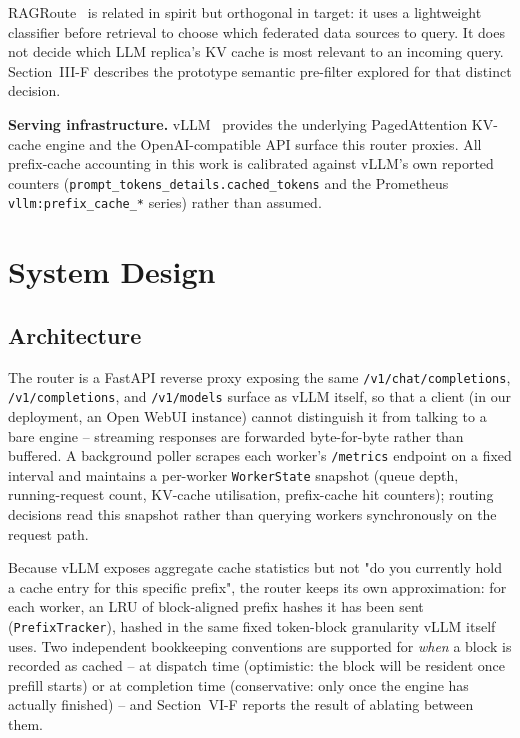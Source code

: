 \documentclass[conference]{IEEEtran}
\begin{document}
RAGRoute~\cite{ragroute2026} is related in spirit but orthogonal in
target: it uses a lightweight classifier before retrieval to choose
which federated data sources to query. It does not decide which LLM
replica's KV cache is most relevant to an incoming query. Section~III-F
describes the prototype semantic pre-filter explored for that distinct
decision.

\textbf{Serving infrastructure.} vLLM~\cite{kwon2023vllm} provides the
underlying PagedAttention KV-cache engine and the OpenAI-compatible API
surface this router proxies. All prefix-cache accounting in this work
is calibrated against vLLM's own reported counters
(\texttt{prompt\_tokens\_details.cached\_tokens} and the Prometheus
\texttt{vllm:prefix\_cache\_*} series) rather than assumed.

\section{System Design}

\subsection{Architecture}

The router is a FastAPI reverse proxy exposing the same
\texttt{/v1/chat/completions}, \texttt{/v1/completions}, and
\texttt{/v1/models} surface as vLLM itself, so that a client (in our
deployment, an Open WebUI instance) cannot distinguish it from talking
to a bare engine -- streaming responses are forwarded byte-for-byte
rather than buffered. A background poller scrapes each worker's
\texttt{/metrics} endpoint on a fixed interval and maintains a
per-worker \texttt{WorkerState} snapshot (queue depth, running-request
count, KV-cache utilisation, prefix-cache hit counters); routing
decisions read this snapshot rather than querying workers synchronously
on the request path.

Because vLLM exposes aggregate cache statistics but not "do you
currently hold a cache entry for this specific prefix", the router
keeps its own approximation: for each worker, an LRU of block-aligned
prefix hashes it has been sent (\texttt{PrefixTracker}), hashed in the
same fixed token-block granularity vLLM itself uses. Two independent
bookkeeping conventions are supported for \emph{when} a block is
recorded as cached -- at dispatch time (optimistic: the block will be
resident once prefill starts) or at completion time (conservative: only
once the engine has actually finished) -- and Section~VI-F reports the
result of ablating between them.
\end{document}

